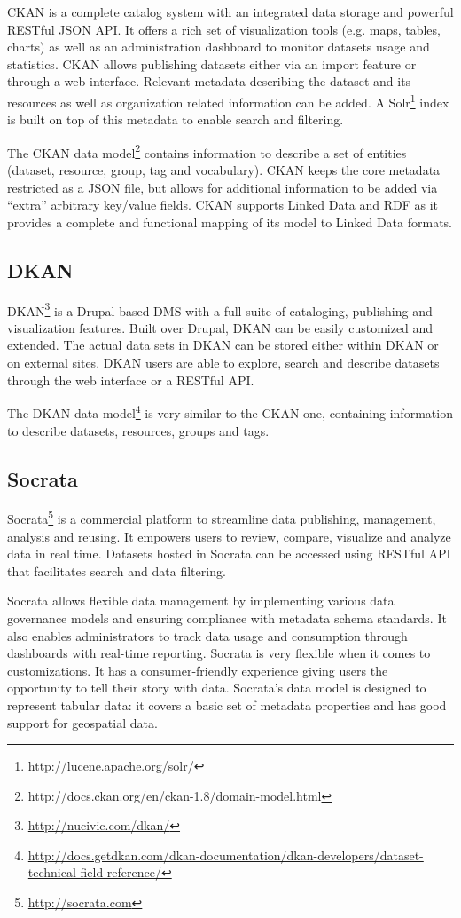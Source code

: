 \documentclass[runningheads,a4paper]{../../Tools/LaTEX/llncs}
\begin{document}
CKAN is a complete catalog system with an integrated data storage and powerful RESTful JSON API. It offers a rich set of visualization tools (e.g. maps, tables, charts) as well as an administration dashboard to monitor datasets usage and statistics. CKAN allows publishing datasets either via an import feature or through a web interface. Relevant metadata describing the dataset and its resources as well as organization related information can be added. A Solr\footnote{\url{http://lucene.apache.org/solr/}} index is built on top of this metadata to enable search and filtering.

The CKAN data model\footnote{http://docs.ckan.org/en/ckan-1.8/domain-model.html} contains information to describe a set of entities (dataset, resource, group, tag and vocabulary). CKAN keeps the core metadata restricted as a JSON file, but allows for additional information to be added via ``extra'' arbitrary key/value fields. CKAN supports Linked Data and RDF as it provides a complete and functional mapping of its model to Linked Data formats.

\subsection{DKAN}
DKAN\footnote{\url{http://nucivic.com/dkan/}} is a Drupal-based DMS with a full suite of cataloging, publishing and visualization features. Built over Drupal, DKAN can be easily customized and extended. The actual data sets in DKAN can be stored either within DKAN or on external sites. DKAN users are able to explore, search and describe datasets through the web interface or a RESTful API.

The DKAN data model\footnote{\url{http://docs.getdkan.com/dkan-documentation/dkan-developers/dataset-technical-field-reference/}} is very similar to the CKAN one, containing information to describe datasets, resources, groups and tags.

\subsection{Socrata}
Socrata\footnote{\url{http://socrata.com}} is a commercial platform to streamline data publishing, management, analysis and reusing. It empowers users to review, compare, visualize and analyze data in real time. Datasets hosted in Socrata can be accessed using RESTful API that facilitates search and data filtering.

Socrata allows flexible data management by implementing various data governance models and ensuring compliance with metadata schema standards. It also enables administrators to track data usage and consumption through dashboards with real-time reporting. Socrata is very flexible when it comes to customizations. It has a consumer-friendly experience giving users the opportunity to tell their story with data. Socrata's data model is designed to represent tabular data: it covers a basic set of metadata properties and has good support for geospatial data.
\end{document}
